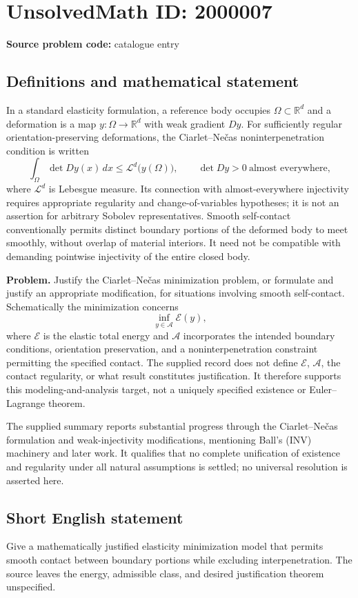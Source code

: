 \documentclass[11pt]{article}
\begin{document}
\section*{UnsolvedMath ID: 2000007}
\textbf{Source problem code:} catalogue entry
\subsection{Definitions and mathematical statement}
In a standard elasticity formulation, a reference body occupies $\Omega\subset\mathbb R^d$ and a deformation is a map $y:\Omega\to\mathbb R^d$ with weak gradient $Dy$. For sufficiently regular orientation-preserving deformations, the Ciarlet--Ne\v{c}as noninterpenetration condition is written
\[
\int_{\Omega}\det Dy(x)\,dx\leq\mathcal L^d\big(y(\Omega)\big),
\qquad \det Dy>0\ \text{almost everywhere},
\]
where $\mathcal L^d$ is Lebesgue measure. Its connection with almost-everywhere injectivity requires appropriate regularity and change-of-variables hypotheses; it is not an assertion for arbitrary Sobolev representatives. Smooth self-contact conventionally permits distinct boundary portions of the deformed body to meet smoothly, without overlap of material interiors. It need not be compatible with demanding pointwise injectivity of the entire closed body.

\textbf{Problem.} Justify the Ciarlet--Ne\v{c}as minimization problem, or formulate and justify an appropriate modification, for situations involving smooth self-contact. Schematically the minimization concerns
\[
\inf_{y\in\mathcal A}\mathcal E(y),
\]
where $\mathcal E$ is the elastic total energy and $\mathcal A$ incorporates the intended boundary conditions, orientation preservation, and a noninterpenetration constraint permitting the specified contact. The supplied record does not define $\mathcal E$, $\mathcal A$, the contact regularity, or what result constitutes justification. It therefore supports this modeling-and-analysis target, not a uniquely specified existence or Euler--Lagrange theorem.

The supplied summary reports substantial progress through the Ciarlet--Ne\v{c}as formulation and weak-injectivity modifications, mentioning Ball's (INV) machinery and later work. It qualifies that no complete unification of existence and regularity under all natural assumptions is settled; no universal resolution is asserted here.
\subsection{Short English statement}
Give a mathematically justified elasticity minimization model that permits smooth contact between boundary portions while excluding interpenetration. The source leaves the energy, admissible class, and desired justification theorem unspecified.
\end{document}
